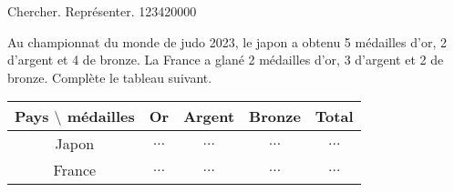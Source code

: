 \begin{pageAD}
\begin{ExoCad}{Chercher. Représenter. }{1234}{2}{0}{0}{0}{0}

Au championnat du monde de judo 2023, le japon a obtenu 5 médailles d'or, 2 d'argent et 4 de bronze. La France a glané 2 médailles d'or, 3 d'argent et 2 de bronze. Complète le tableau suivant.

 \begin{center}
 \begin{tabular}{|c|c|c|c|c|}\hline 
  Pays $\setminus$ médailles& Or & Argent & Bronze & Total\\\hline 
  Japon & $\ldots$ & $\ldots$ & $\ldots$ & $\ldots$ \\\hline
  France & $\ldots$ & $\ldots$ & $\ldots$& $\ldots$  \\\hline
 \end{tabular}
 \end{center}
\end{ExoCad}

\end{pageAD} 


